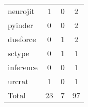 \begin{tabular}{lccc}
 neurojit      &       1        &        0         &       2        \\
 pyinder       &       0        &        0         &       2        \\
 dueforce      &       0        &        1         &       2        \\
 sctype        &       0        &        1         &       1        \\
 inference     &       0        &        0         &       1        \\
 urcrat        &       1        &        0         &       1        \\
 Total         &       23       &        7         &       97       \\
\bottomrule
\end{tabular}